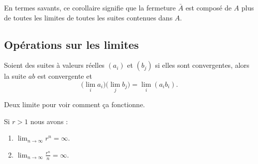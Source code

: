 En termes savants, ce corollaire signifie que la fermeture $\bar A$ est composé de $A$ plus de toutes les limites de toutes les suites contenues dans $A$.

\subsection{Opérations sur les limites}

\begin{proposition}     \label{PROPooIQOAooJPMoDD}
    Soient des suites à valeurs réelles \( (a_i)\) et \( (b_j)\) si elles sont convergentes, alors la suite \( ab\) est convergente et
    \begin{equation}
        \big( \lim_ia_i \big)\big( \lim_jb_j \big)=\lim_i(a_ib_i).
    \end{equation}
\end{proposition}
 

Deux limite pour voir comment ça fonctionne.
\begin{lemma}
    Si \( r>1\) nous avons :
    \begin{enumerate}
        \item
            \( \lim_{n\to \infty} r^n=\infty\).
        \item
            \( \lim_{n\to \infty} \frac{ r^n }{ n }=\infty\).
    \end{enumerate}
\end{lemma}

